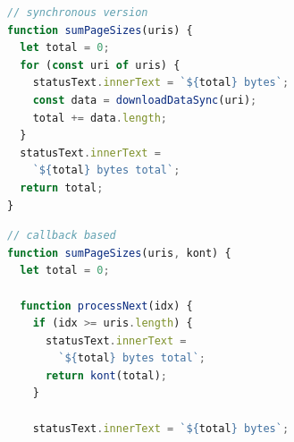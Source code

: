 \begin{figure}
  \begin{minipage}[t]{0.5\textwidth}
    \begin{minipage}{\textwidth}%
\begin{lstlisting}[language=JavaScript]
// synchronous version
function sumPageSizes(uris) {
  let total = 0;
  for (const uri of uris) {
    statusText.innerText = `${total} bytes`;
    const data = downloadDataSync(uri);
    total += data.length;
  }
  statusText.innerText =
    `${total} bytes total`;
  return total;
}
\end{lstlisting}
      \vspace{1em}
    \end{minipage}
    \begin{minipage}{\textwidth}%
\begin{lstlisting}[language=JavaScript]
// callback based
function sumPageSizes(uris, kont) {
  let total = 0;

  function processNext(idx) {
    if (idx >= uris.length) {
      statusText.innerText = 
        `${total} bytes total`;
      return kont(total);
    }

    statusText.innerText = `${total} bytes`;


\end{lstlisting}
\end{minipage}
\end{minipage}
\end{figure}
